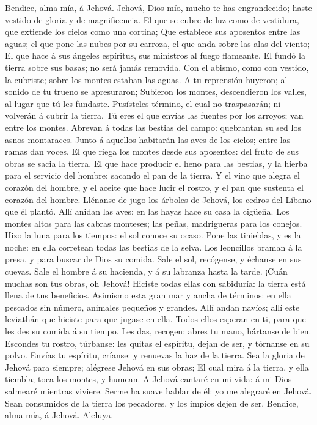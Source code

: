  Bendice, alma mía, á Jehová. Jehová, Dios mío, mucho te
has engrandecido; haste vestido de gloria y de magnificencia.
 El que se cubre de luz como de vestidura, que extiende
los cielos como una cortina;  Que establece sus aposentos
entre las aguas; el que pone las nubes por su carroza, el que anda sobre
las alas del viento;  El que hace á sus ángeles espíritus,
sus ministros al fuego flameante.  El fundó la tierra
sobre sus basas; no será jamás removida.  Con el abismo,
como con vestido, la cubriste; sobre los montes estaban las aguas.
 A tu reprensión huyeron; al sonido de tu trueno se
apresuraron;  Subieron los montes, descendieron los
valles, al lugar que tú les fundaste.  Pusísteles término,
el cual no traspasarán; ni volverán á cubrir la tierra. 
Tú eres el que envías las fuentes por los arroyos; van entre los montes.
 Abrevan á todas las bestias del campo: quebrantan su sed
los asnos montaraces.  Junto á aquellos habitarán las
aves de los cielos; entre las ramas dan voces.  El que
riega los montes desde sus aposentos: del fruto de sus obras se sacia la
tierra.  El que hace producir el heno para las bestias, y
la hierba para el servicio del hombre; sacando el pan de la tierra.
 Y el vino que alegra el corazón del hombre, y el aceite
que hace lucir el rostro, y el pan que sustenta el corazón del hombre.
 Llénanse de jugo los árboles de Jehová, los cedros del
Líbano que él plantó.  Allí anidan las aves; en las hayas
hace su casa la cigüeña.  Los montes altos para las
cabras monteses; las peñas, madrigueras para los conejos.
 Hizo la luna para los tiempos: el sol conoce su ocaso.
 Pone las tinieblas, y es la noche: en ella corretean
todas las bestias de la selva.  Los leoncillos braman á
la presa, y para buscar de Dios su comida.  Sale el sol,
recógense, y échanse en sus cuevas.  Sale el hombre á su
hacienda, y á su labranza hasta la tarde.  ¡Cuán muchas
son tus obras, oh Jehová! Hiciste todas ellas con sabiduría: la tierra
está llena de tus beneficios.  Asimismo esta gran mar y
ancha de términos: en ella pescados sin número, animales pequeños y
grandes.  Allí andan navíos; allí este leviathán que
hiciste para que jugase en ella.  Todos ellos esperan en
ti, para que les des su comida á su tiempo.  Les das,
recogen; abres tu mano, hártanse de bien.  Escondes tu
rostro, túrbanse: les quitas el espíritu, dejan de ser, y tórnanse en su
polvo.  Envías tu espíritu, críanse: y renuevas la haz de
la tierra.  Sea la gloria de Jehová para siempre;
alégrese Jehová en sus obras;  El cual mira á la tierra,
y ella tiembla; toca los montes, y humean.  A Jehová
cantaré en mi vida: á mi Dios salmearé mientras viviere. 
Serme ha suave hablar de él: yo me alegraré en Jehová. 
Sean consumidos de la tierra los pecadores, y los impíos dejen de ser.
Bendice, alma mía, á Jehová. Aleluya.

